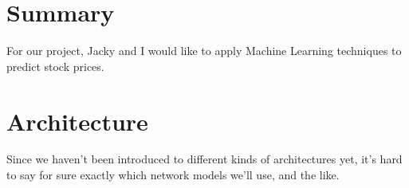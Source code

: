 \documentclass{article}
\begin{document}
\section{Summary}
For our project, Jacky and I would like to apply Machine Learning
techniques to predict stock prices.
\section{Architecture}
Since we haven't been introduced to different kinds of architectures
yet, it's hard to say for sure exactly which network models we'll use,
and the like.
\end{document}
